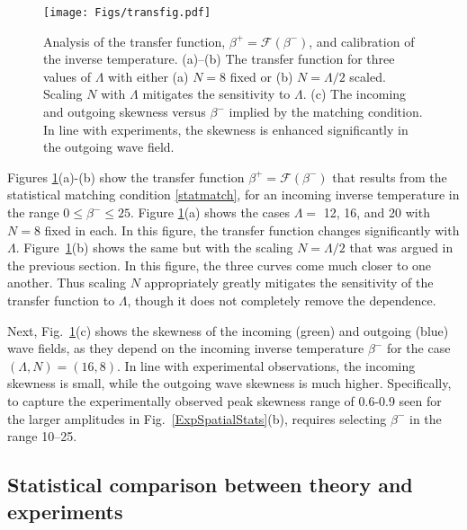 \documentclass[11pt]{article}
\newcommand{\lamfac}{N}
\newcommand{\invtemp}{\beta}
\newcommand{\itup}{\invtemp^{-}}
\newcommand{\itdn}{\invtemp^{+}}
\newcommand{\transf}{\mathcal{F}}
\begin{document}
\begin{figure}%
\begin{center}
\texttt{[image: Figs/transfig.pdf]}
\caption{
Analysis of the transfer function, $\itdn = \transf \left( \itup \right)$, and calibration of the inverse temperature. (a)--(b) The transfer function for three values of $\Lambda$ with either (a) $\lamfac = 8$ fixed or (b) $\lamfac = \Lambda/2$ scaled. Scaling $\lamfac$ with $\Lambda$ mitigates the sensitivity to $\Lambda$. (c) The incoming and outgoing skewness versus $\itup$ implied by the matching condition. In line with experiments, the skewness is enhanced significantly in the outgoing wave field.
}
\label{transfig}
\end{center}
\end{figure}
 
	Figures \ref{transfig}(a)-(b) show the transfer function $\itdn = \transf(\itup)$ that results from the statistical matching condition \eqref{statmatch}, for an incoming inverse temperature in the range $0 \le \itup \le 25$. Figure \ref{transfig}(a) shows the cases $\Lambda = $ 12, 16, and 20 with $\lamfac = 8$ fixed in each. In this figure, the transfer function changes significantly with $\Lambda$. Figure~\ref{transfig}(b) shows the same but with the scaling $\lamfac = \Lambda/2$ that was argued in the previous section. In this figure, the three curves come much closer to one another. Thus scaling $\lamfac$ appropriately greatly mitigates the sensitivity of the transfer function to $\Lambda$, though it does not completely remove the dependence.
 
	Next, Fig.~\ref{transfig}(c) shows the skewness of the incoming (green) and outgoing (blue) wave fields, as they depend on the incoming inverse temperature $\itup$ for the case $(\Lambda, \lamfac) = (16, 8)$. In line with experimental observations, the incoming skewness is small, while the outgoing wave skewness is much higher. Specifically, to capture the experimentally observed peak skewness range of 0.6-0.9 seen for the larger amplitudes in Fig.~\ref{ExpSpatialStats}(b), requires selecting $\itup$ in the range 10--25.

\subsection{Statistical comparison between theory and experiments}
\end{document}
